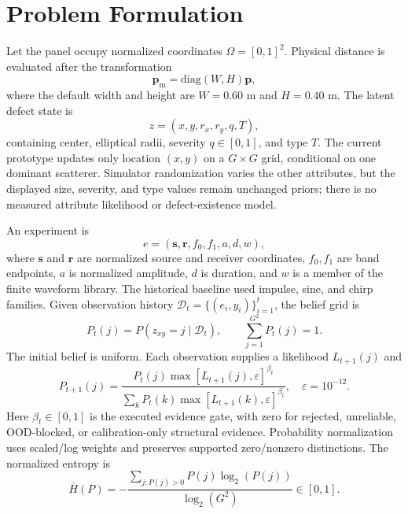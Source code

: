 \documentclass[conference]{IEEEtran}
\newcommand{\vect}[1]{\boldsymbol{#1}}
\newcommand{\eps}{\varepsilon}
\newcommand{\Hn}{\bar{H}}
\begin{document}
\section{Problem Formulation}
Let the panel occupy normalized coordinates $\Omega=[0,1]^2$. Physical distance is evaluated after the transformation
\begin{equation}
 \vect{p}_{\mathrm{m}}=\mathrm{diag}(W,H)\vect{p},
 \label{eq:physical-map}
\end{equation}
where the default width and height are $W=0.60$ m and $H=0.40$ m. The latent defect state is
\begin{equation}
 z=(x,y,r_x,r_y,q,T),
\end{equation}
containing center, elliptical radii, severity $q\in[0,1]$, and type $T$. The current prototype updates only location $(x,y)$ on a $G\times G$ grid, conditional on one dominant scatterer. Simulator randomization varies the other attributes, but the displayed size, severity, and type values remain unchanged priors; there is no measured attribute likelihood or defect-existence model.

An experiment is
\begin{equation}
 e=(\vect{s},\vect{r},f_0,f_1,a,d,w),
\end{equation}
where $\vect{s}$ and $\vect{r}$ are normalized source and receiver coordinates, $f_0,f_1$ are band endpoints, $a$ is normalized amplitude, $d$ is duration, and $w$ is a member of the finite waveform library. The historical baseline used impulse, sine, and chirp families. Given observation history $\mathcal{D}_t=\{(e_i,y_i)\}_{i=1}^{t}$, the belief grid is
\begin{equation}
 P_t(j)=P(z_{xy}=j\mid\mathcal{D}_t),\qquad
 \sum_{j=1}^{G^2}P_t(j)=1.
\end{equation}
The initial belief is uniform. Each observation supplies a likelihood $L_{t+1}(j)$ and
\begin{equation}
 P_{t+1}(j)=\frac{P_t(j)\max[L_{t+1}(j),\eps]^{\beta_t}}
 {\sum_kP_t(k)\max[L_{t+1}(k),\eps]^{\beta_t}},\quad \eps=10^{-12}.
 \label{eq:bayes}
\end{equation}
Here $\beta_t\in[0,1]$ is the executed evidence gate, with zero for rejected, unreliable, OOD-blocked, or calibration-only structural evidence. Probability normalization uses scaled/log weights and preserves supported zero/nonzero distinctions. The normalized entropy is
\begin{equation}
 \Hn(P)=-\frac{\sum_{j:P(j)>0}P(j)\log_2(P(j))}{\log_2(G^2)}\in[0,1].
 \label{eq:entropy}
\end{equation}
\end{document}
